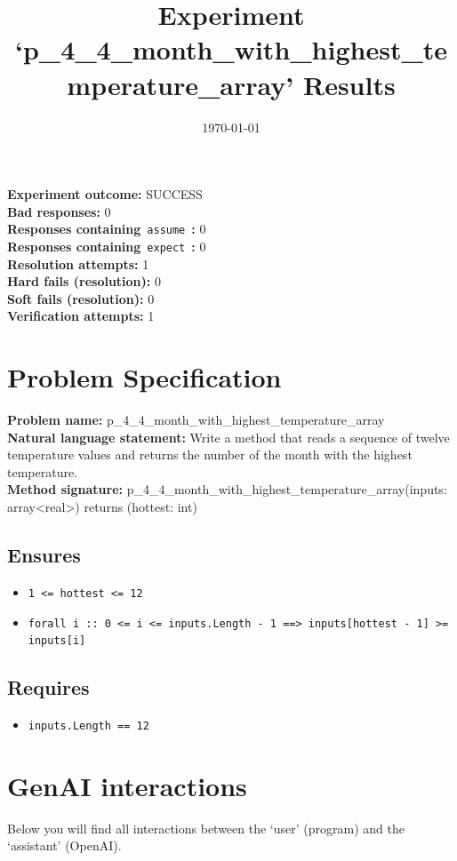 \documentclass{article}
\begin{document}
\title{Experiment `p\_4\_4\_month\_with\_highest\_temperature\_array' Results}
\author{\today}
\date{}
\maketitle
\textbf{Experiment outcome: }SUCCESS
\\\textbf{Bad responses: }0
\\\textbf{Responses containing}~\texttt{assume}~\textbf{: }0
\\\textbf{Responses containing}~\texttt{expect}~\textbf{: }0
\\\textbf{Resolution attempts: }1
\\\textbf{Hard fails (resolution): }0
\\\textbf{Soft fails (resolution): }0
\\\textbf{Verification attempts: }1
\section*{Problem Specification}
\textbf{Problem name: }p\_4\_4\_month\_with\_highest\_temperature\_array
\\\textbf{Natural language statement: }Write a method that reads a sequence of twelve temperature values and returns the number of the month with the highest temperature.
\\\textbf{Method signature: }p\_4\_4\_month\_with\_highest\_temperature\_array(inputs: array<real>) returns (hottest: int)
\subsection*{Ensures}
\begin{itemize}
\item \texttt{1 <= hottest <= 12}
\item \texttt{forall i :: 0 <= i <= inputs.Length - 1 ==> inputs[hottest - 1] >= inputs[i]}
\end{itemize}
\subsection*{Requires}
\begin{itemize}
\item \texttt{inputs.Length == 12}
\end{itemize}
\clearpage
\section*{GenAI interactions}
Below you will find all interactions between the `user' (program) and the `assistant' (OpenAI).
\end{document}
